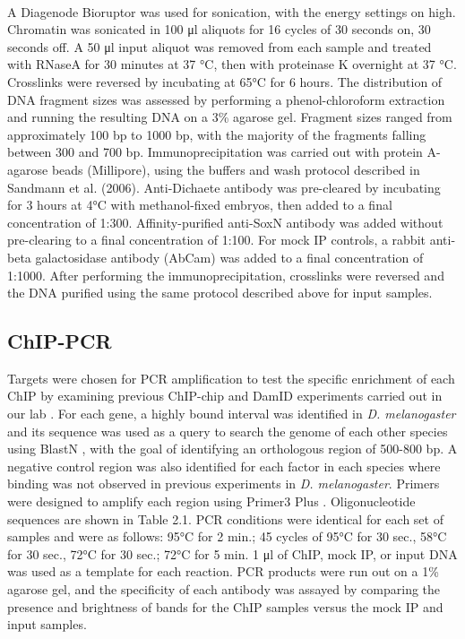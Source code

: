 \paragraph{}
A Diagenode Bioruptor was used for sonication, with the energy settings on high. Chromatin was sonicated in 100 μl aliquots for 16 cycles of 30 seconds on, 30 seconds off. A 50 μl input aliquot was removed from each sample and treated with RNaseA for 30 minutes at 37 °C, then with proteinase K overnight at 37 °C. Crosslinks were reversed by incubating at 65°C for 6 hours. The distribution of DNA fragment sizes was assessed by performing a phenol-chloroform extraction and running the resulting DNA on a 3\% agarose gel. Fragment sizes ranged from approximately 100 bp to 1000 bp, with the majority of the fragments falling between 300 and 700 bp. Immunoprecipitation was carried out with protein A-agarose beads (Millipore), using the buffers and wash protocol described in Sandmann et al. (2006). Anti-Dichaete antibody was pre-cleared by incubating for 3 hours at 4°C with methanol-fixed embryos, then added to a final concentration of 1:300. Affinity-purified anti-SoxN antibody was added without pre-clearing to a final concentration of 1:100. For mock IP controls, a rabbit anti-beta galactosidase antibody (AbCam) was added to a final concentration of 1:1000. After performing the immunoprecipitation, crosslinks were reversed and the DNA purified using the same protocol described above for input samples.
\subsection{ChIP-PCR}
Targets were chosen for PCR amplification to test the specific enrichment of each ChIP by examining previous ChIP-chip and DamID experiments carried out in our lab \citep{aleksic_role_2013,ferrero_soxneuro_2014}. For each gene, a highly bound interval was identified in \emph{D. melanogaster} and its sequence was used as a query to search the genome of each other species using BlastN \citep{altschul_basic_1990}, with the goal of identifying an orthologous region of 500-800 bp. A negative control region was also identified for each factor in each species where binding was not observed in previous experiments in \emph{D. melanogaster}. Primers were designed to amplify each region using Primer3 Plus \citep{untergasser_primer3plus_2007}. Oligonucleotide sequences are shown in Table 2.1. PCR conditions were identical for each set of samples and were as follows: 95°C for 2 min.; 45 cycles of 95°C for 30 sec., 58°C for 30 sec., 72°C for 30 sec.; 72°C for 5 min. 1 μl of ChIP, mock IP, or input DNA was used as a template for each reaction. PCR products were run out on a 1\% agarose gel, and the specificity of each antibody was assayed by comparing the presence and brightness of bands for the ChIP samples versus the mock IP and input samples.
